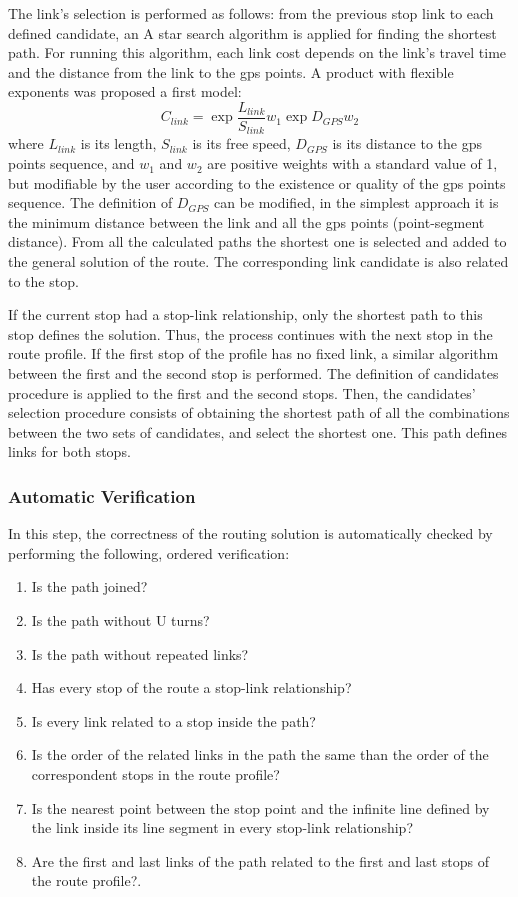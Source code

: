 The link's selection is performed as follows: from the previous stop link to each defined candidate, an A star search algorithm is applied for finding the shortest path. For running this algorithm, each link cost depends on the link's travel time and the distance from the link to the \gls{gps} points. A product with flexible exponents was proposed a first model:
%
\begin{equation}
\label{eq:LinkCost}
	C_{link} = \exp{\frac{L_{link}}{S_{link}}}{w_{1}}\exp{D_{GPS}}{w_{2}}
\end{equation}
%
where $L_{link}$ is its length, $S_{link}$ is its free speed, $D_{GPS}$ is its distance to the \gls{gps} points sequence, and $w_{1}$ and $w_{2}$ are positive weights with a standard value of 1, but modifiable by the user according to the existence or quality of the \gls{gps} points sequence. The definition of $D_{GPS}$ can be modified, in the simplest approach it is the minimum distance between the link and all the \gls{gps} points (point-segment distance). From all the calculated paths the shortest one is selected and added to the general solution of the route. The corresponding link candidate is also related to the stop. 

If the current stop had a stop-link relationship, only the shortest path to this stop defines the solution. Thus, the process continues with the next stop in the route profile. If the first stop of the profile has no fixed link, a similar algorithm between the first and the second stop is performed. The definition of candidates procedure is applied to the first and the second stops. Then, the candidates' selection procedure consists of obtaining the shortest path of all the combinations between the two sets of candidates, and select the shortest one. This path defines links for both stops.

\subsubsection{Automatic Verification}
In this step, the correctness of the routing solution is automatically checked by performing the following, ordered verification:
%
\begin{enumerate}\styleEnumerate
\item Is the path joined?
\item Is the path without U turns?
\item Is the path without repeated links?
\item Has every stop of the route a stop-link relationship?
\item Is every link related to a stop inside the path?
\item Is the order of the related links in the path the same than the order of the correspondent stops in the route profile?
\item Is the nearest point between the stop point and the infinite line defined by the link inside its line segment in every stop-link relationship?
\item Are the first and last links of the path related to the first and last  stops of the route profile?.
\end{enumerate}

